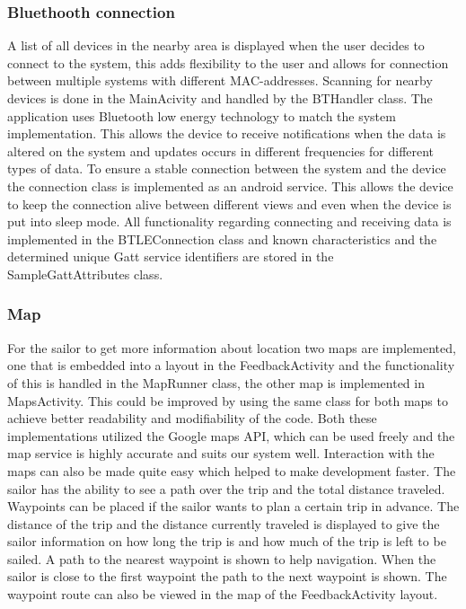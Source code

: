 \subsubsection{Bluethooth connection}
A list of all devices in the nearby area is displayed when the user decides to connect to the system, this adds flexibility to the user and allows for connection between multiple systems with different MAC-addresses. Scanning for nearby devices is done in the MainAcivity and handled by the BTHandler class. The application uses Bluetooth low energy technology to match the system implementation. This allows the device to receive notifications when the data is altered on the system and updates occurs in different frequencies for different types of data. To ensure a stable connection between the system and the device the connection class is implemented as an android service\cite{android-service}. This allows the device to keep the connection alive between different views and even when the device is put into sleep mode. All functionality regarding connecting and receiving data is implemented in the BTLEConnection class and known characteristics and the determined unique Gatt service identifiers are stored in the SampleGattAttributes class.

\subsubsection{Map}
For the sailor to get more information about location two maps are implemented, one that is embedded into a layout in the FeedbackActivity and the functionality of this is handled in the MapRunner class, the other map is implemented in MapsActivity. This could be improved by using the same class for both maps to achieve better readability and modifiability of the code. Both these implementations utilized the Google maps API\cite{gmaps}, which can be used freely and the map service is highly accurate and suits our system well. Interaction with the maps can also be made quite easy which helped to make development faster. The sailor has the ability to see a path over the trip and the total distance traveled. Waypoints can be placed if the sailor wants to plan a certain trip in advance. The distance of the trip and the distance currently traveled is displayed to give the sailor information on how long the trip is and how much of the trip is left to be sailed. A path to the nearest waypoint is shown to help navigation. When the sailor is close to the first waypoint the path to the next waypoint is shown. The waypoint route can also be viewed in the map of the FeedbackActivity layout.

